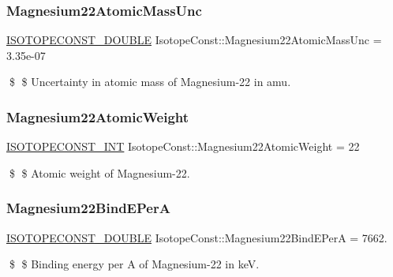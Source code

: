 \subsubsection{\texorpdfstring{Magnesium22\+Atomic\+Mass\+Unc}{Magnesium22AtomicMassUnc}}
{\footnotesize\ttfamily \mbox{\hyperlink{group___isotope_const-_macros_ga8f45a7272ce02c0b4c65c44636ed719a}{I\+S\+O\+T\+O\+P\+E\+C\+O\+N\+S\+T\+\_\+\+D\+O\+U\+B\+LE}} Isotope\+Const\+::\+Magnesium22\+Atomic\+Mass\+Unc = 3.\+35e-\/07}

\$ \$ Uncertainty in atomic mass of Magnesium-\/22 in amu. \mbox{\label{group___isotope_const-_magnesium-_mg22_gaac855882f0320e7c536e41be3e1a7fed}} 
\subsubsection{\texorpdfstring{Magnesium22\+Atomic\+Weight}{Magnesium22AtomicWeight}}
{\footnotesize\ttfamily \mbox{\hyperlink{group___isotope_const-_macros_ga5f18360b3e99483a35c32d789e62621c}{I\+S\+O\+T\+O\+P\+E\+C\+O\+N\+S\+T\+\_\+\+I\+NT}} Isotope\+Const\+::\+Magnesium22\+Atomic\+Weight = 22}

\$ \$ Atomic weight of Magnesium-\/22. \mbox{\label{group___isotope_const-_magnesium-_mg22_gab8d98b9adabd6328627b3055589cd278}} 
\subsubsection{\texorpdfstring{Magnesium22\+Bind\+E\+PerA}{Magnesium22BindEPerA}}
{\footnotesize\ttfamily \mbox{\hyperlink{group___isotope_const-_macros_ga8f45a7272ce02c0b4c65c44636ed719a}{I\+S\+O\+T\+O\+P\+E\+C\+O\+N\+S\+T\+\_\+\+D\+O\+U\+B\+LE}} Isotope\+Const\+::\+Magnesium22\+Bind\+E\+PerA = 7662.}

\$ \$ Binding energy per A of Magnesium-\/22 in keV. \mbox{\label{group___isotope_const-_magnesium-_mg22_ga34ba4d29cd3d4e329a8eae9da93e4d71}} 
